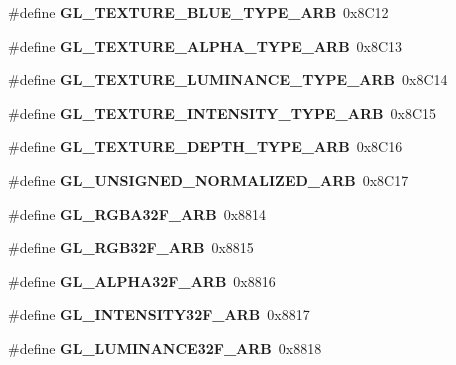 \begin{DoxyCompactItemize}
\item 
\#define {\bfseries G\+L\+\_\+\+T\+E\+X\+T\+U\+R\+E\+\_\+\+B\+L\+U\+E\+\_\+\+T\+Y\+P\+E\+\_\+\+A\+R\+B}~0x8\+C12\label{_s_d_l__opengl_8h_a14014e5586666595be69a8635b6aad5c}

\item 
\#define {\bfseries G\+L\+\_\+\+T\+E\+X\+T\+U\+R\+E\+\_\+\+A\+L\+P\+H\+A\+\_\+\+T\+Y\+P\+E\+\_\+\+A\+R\+B}~0x8\+C13\label{_s_d_l__opengl_8h_ad20aa9abc01ab6feccc73d932b5d9fae}

\item 
\#define {\bfseries G\+L\+\_\+\+T\+E\+X\+T\+U\+R\+E\+\_\+\+L\+U\+M\+I\+N\+A\+N\+C\+E\+\_\+\+T\+Y\+P\+E\+\_\+\+A\+R\+B}~0x8\+C14\label{_s_d_l__opengl_8h_a0df197cd740341f8f6d2ec4b840e65f2}

\item 
\#define {\bfseries G\+L\+\_\+\+T\+E\+X\+T\+U\+R\+E\+\_\+\+I\+N\+T\+E\+N\+S\+I\+T\+Y\+\_\+\+T\+Y\+P\+E\+\_\+\+A\+R\+B}~0x8\+C15\label{_s_d_l__opengl_8h_a75fbfcd1a5c5f71baa7d8e67e12505a5}

\item 
\#define {\bfseries G\+L\+\_\+\+T\+E\+X\+T\+U\+R\+E\+\_\+\+D\+E\+P\+T\+H\+\_\+\+T\+Y\+P\+E\+\_\+\+A\+R\+B}~0x8\+C16\label{_s_d_l__opengl_8h_a8515fe4165f642997c12487a3fc2debf}

\item 
\#define {\bfseries G\+L\+\_\+\+U\+N\+S\+I\+G\+N\+E\+D\+\_\+\+N\+O\+R\+M\+A\+L\+I\+Z\+E\+D\+\_\+\+A\+R\+B}~0x8\+C17\label{_s_d_l__opengl_8h_a5ac453c9bc4026c116e656bcd51fcee6}

\item 
\#define {\bfseries G\+L\+\_\+\+R\+G\+B\+A32\+F\+\_\+\+A\+R\+B}~0x8814\label{_s_d_l__opengl_8h_a3d25eb63c2737538513f7b6d7d6a051e}

\item 
\#define {\bfseries G\+L\+\_\+\+R\+G\+B32\+F\+\_\+\+A\+R\+B}~0x8815\label{_s_d_l__opengl_8h_a29fc11f4eadee777054a0acc314fbabb}

\item 
\#define {\bfseries G\+L\+\_\+\+A\+L\+P\+H\+A32\+F\+\_\+\+A\+R\+B}~0x8816\label{_s_d_l__opengl_8h_a7fe1498cab0f571b33c45784948f6656}

\item 
\#define {\bfseries G\+L\+\_\+\+I\+N\+T\+E\+N\+S\+I\+T\+Y32\+F\+\_\+\+A\+R\+B}~0x8817\label{_s_d_l__opengl_8h_ae1b800cc82e2cbf329dfbebe41f3dce9}

\item 
\#define {\bfseries G\+L\+\_\+\+L\+U\+M\+I\+N\+A\+N\+C\+E32\+F\+\_\+\+A\+R\+B}~0x8818\label{_s_d_l__opengl_8h_a33ba6a053a7de364352204dc9a2dc0d4}


\end{DoxyCompactItemize}

